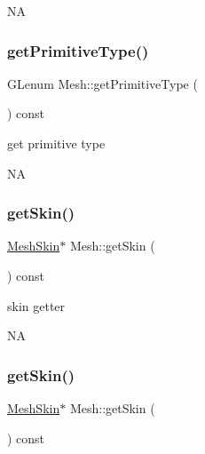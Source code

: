 NA \mbox{\label{classMesh_a1b3969fa1a815cafb840cb7ab8a83ad7}} 
\subsubsection{\texorpdfstring{get\+Primitive\+Type()}{getPrimitiveType()}\hspace{0.1cm}{\footnotesize\ttfamily [2/2]}}
{\footnotesize\ttfamily G\+Lenum Mesh\+::get\+Primitive\+Type (\begin{DoxyParamCaption}{ }\end{DoxyParamCaption}) const}

get primitive type

NA \mbox{\label{classMesh_a2d8bd33f1b0978afe7fbc37359b7e8a9}} 
\subsubsection{\texorpdfstring{get\+Skin()}{getSkin()}\hspace{0.1cm}{\footnotesize\ttfamily [1/2]}}
{\footnotesize\ttfamily \hyperlink{classMeshSkin}{Mesh\+Skin}$\ast$ Mesh\+::get\+Skin (\begin{DoxyParamCaption}{ }\end{DoxyParamCaption}) const\hspace{0.3cm}{\ttfamily [inline]}}

skin getter

NA \mbox{\label{classMesh_a2d8bd33f1b0978afe7fbc37359b7e8a9}} 
\subsubsection{\texorpdfstring{get\+Skin()}{getSkin()}\hspace{0.1cm}{\footnotesize\ttfamily [2/2]}}
{\footnotesize\ttfamily \hyperlink{classMeshSkin}{Mesh\+Skin}$\ast$ Mesh\+::get\+Skin (\begin{DoxyParamCaption}{ }\end{DoxyParamCaption}) const\hspace{0.3cm}{\ttfamily [inline]}}

